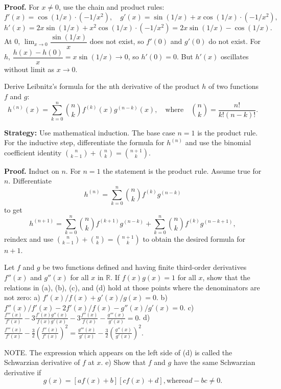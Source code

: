 \noindent\textbf{Proof.}
For $x\ne 0$, use the chain and product rules:
\[f'(x)=\cos(1/x)\cdot(-1/x^2),\quad g'(x)=\sin(1/x)+x\cos(1/x)\cdot(-1/x^2),\]
\[h'(x)=2x\sin(1/x)+x^2\cos(1/x)\cdot(-1/x^2)=2x\sin(1/x)-\cos(1/x).\]
At $0$, $\lim_{x\to 0}\dfrac{\sin(1/x)}{x}$ does not exist, so $f'(0)$ and $g'(0)$ do not exist. For $h$, $\dfrac{h(x)-h(0)}{x}=x\sin(1/x)\to 0$, so $h'(0)=0$. But $h'(x)$ oscillates without limit as $x\to 0$.



\begin{problembox}
Derive Leibnitz's formula for the nth derivative of the product \( h \) of two functions \( f \) and \( g \):
\[ h^{(n)}(x) = \sum_{k=0}^{n} \binom{n}{k} f^{(k)}(x)g^{(n-k)}(x), \quad \text{where} \quad \binom{n}{k} = \frac{n!}{k!(n-k)!}. \]
\end{problembox}

\noindent\textbf{Strategy:} Use mathematical induction. The base case \( n = 1 \) is the product rule. For the inductive step, differentiate the formula for \( h^{(n)} \) and use the binomial coefficient identity \( \binom{n}{k-1} + \binom{n}{k} = \binom{n+1}{k} \).

\noindent\textbf{Proof.}
Induct on $n$. For $n=1$ the statement is the product rule. Assume true for $n$. Differentiate
\[h^{(n)}=\sum_{k=0}^n\binom{n}{k}f^{(k)}g^{(n-k)}\]
to get
\[h^{(n+1)}=\sum_{k=0}^n\binom{n}{k}f^{(k+1)}g^{(n-k)}+\sum_{k=0}^n\binom{n}{k}f^{(k)}g^{(n-k+1)},\]
reindex and use $\binom{n}{k-1}+\binom{n}{k}=\binom{n+1}{k}$ to obtain the desired formula for $n+1$.



\begin{problembox}
Let \( f \) and \( g \) be two functions defined and having finite third-order derivatives \( f''(x) \) and \( g''(x) \) for all \( x \) in \( \mathbb{R} \). If \( f(x)g(x) = 1 \) for all \( x \), show that the relations in (a), (b), (c), and (d) hold at those points where the denominators are not zero:
a) \( f'(x)/f(x) + g'(x)/g(x) = 0 \).
b) \( f''(x)/f'(x) - 2f'(x)/f(x) - g''(x)/g'(x) = 0 \).
c) \( \frac{f'''(x)}{f'(x)} - 3\frac{f'(x)g''(x)}{f(x)g'(x)} - 3\frac{f''(x)}{f(x)} - \frac{g'''(x)}{g'(x)} = 0 \).
d) \( \frac{f'''(x)}{f'(x)} - \frac{3}{2}\left(\frac{f''(x)}{f'(x)}\right)^2 = \frac{g'''(x)}{g'(x)} - \frac{3}{2}\left(\frac{g''(x)}{g'(x)}\right)^2 \).

NOTE. The expression which appears on the left side of (d) is called the Schwarzian derivative of \( f \) at \( x \).
e) Show that \( f \) and \( g \) have the same Schwarzian derivative if
\[ g(x) = [af(x) + b][cf(x) + d], \text{where} ad - bc \neq 0. \]
\end{problembox}

